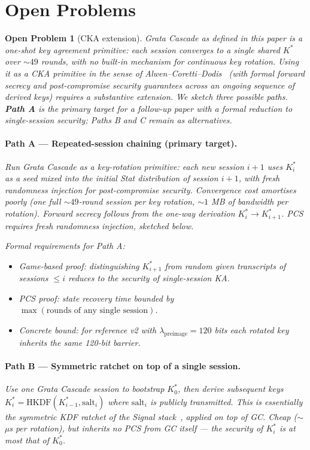 \documentclass[11pt,a4paper]{article}
\newtheorem{openproblem}{Open Problem}
\begin{document}
\section{Open Problems}\label{sec:open}

\begin{openproblem}[CKA extension]\label{prob:cka-extension}
Grata Cascade as defined in this paper is a \emph{one-shot} key agreement primitive: each session converges to a single shared $K^*$ over $\sim 49$ rounds, with no built-in mechanism for continuous key rotation. Using it as a CKA primitive in the sense of Alwen--Coretti--Dodis~\cite{ACD19} (with formal forward secrecy and post-compromise security guarantees across an ongoing sequence of derived keys) requires a substantive extension. We sketch three possible paths. \textbf{Path A} is the primary target for a follow-up paper with a formal reduction to single-session security; Paths B and C remain as alternatives.

\paragraph{Path A --- Repeated-session chaining (primary target).}
Run Grata Cascade as a key-rotation primitive: each new session $i+1$ uses $K^*_i$ as a seed mixed into the initial Stat distribution of session $i+1$, with fresh randomness injection for post-compromise security. Convergence cost amortises poorly (one full $\sim 49$-round session per key rotation, $\sim 1$ MB of bandwidth per rotation). Forward secrecy follows from the one-way derivation $K^*_i \to K^*_{i+1}$. PCS requires fresh randomness injection, sketched below.

\emph{Formal requirements for Path A:}
\begin{itemize}[leftmargin=*]
\item Game-based proof: distinguishing $K^*_{i+1}$ from random given transcripts of sessions $\leq i$ reduces to the security of single-session KA.
\item PCS proof: state recovery time bounded by $\max(\text{rounds of any single session})$.
\item Concrete bound: for reference v2 with $\lambda_\text{preimage} = 120$ bits each rotated key inherits the same 120-bit barrier.
\end{itemize}

\paragraph{Path B --- Symmetric ratchet on top of a single session.}
Use one Grata Cascade session to bootstrap $K^*_0$, then derive subsequent keys $K^*_i = \mathrm{HKDF}(K^*_{i-1}, \mathrm{salt}_i)$ where $\mathrm{salt}_i$ is publicly transmitted. This is essentially the symmetric KDF ratchet of the Signal stack~\cite{DR2017}, applied on top of GC. Cheap ($\sim$ µs per rotation), but inherits \emph{no} PCS from GC itself --- the security of $K^*_i$ is at most that of $K^*_0$.


\end{openproblem}
\end{document}
